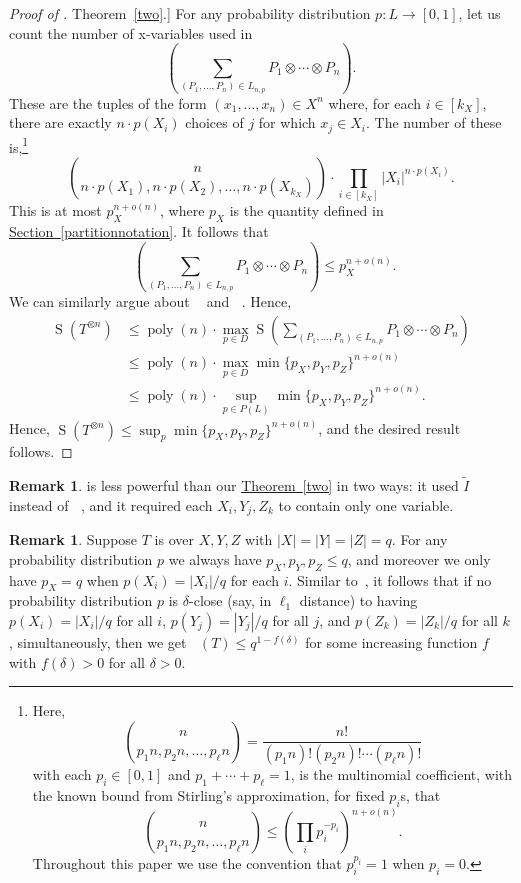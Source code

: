 \documentclass[11pt]{article}
\numberwithin{equation}{section}
\theoremstyle{definition}
\newtheorem{remark}[theorem]{Remark}
\theoremstyle{plain}
\newcommand{\expref}[2]{\hyperref[#2]{#1~\ref{#2}}}
\newcommand{\poly}{\mathop{\mathrm{poly}}}
\newcommand{\sr}{\mathop{\operatorname{S}}}
\newcommand{\xr}{\mathop{\operatorname{S_x}}}
\newcommand{\yr}{\mathop{\operatorname{S_y}}}
\newcommand{\zr}{\mathop{\operatorname{S_z}}}
\newcommand{\tsr}{\mathop{\tilde{\operatorname{S}}}}
\theoremstyle{definition}
\begin{document}
\begin{proof}[Proof of \expref{Theorem}{two}.]
For any probability distribution $p : L \to [0,1]$, let us count the number of x-variables used in
\[
  \left( \sum_{(P_1, \ldots, P_n) \in L_{n,p}}P_1 \otimes \cdots \otimes P_n \right).
\]
These are the tuples of the form $(x_1, \ldots, x_n) \in X^n$ where, for each $i \in [k_X]$, there are exactly $n \cdot p(X_i)$ choices of $j$ for which $x_j \in X_i$. The number of these is,\footnote{Here, \[
    \binom{n}{p_1 n, p_2 n, \ldots, p_\ell n } = \frac{n!}{(p_1 n)! (p_2 n)! \cdots (p_\ell n)!}
  \]
  with each $p_i \in [0,1]$ and $p_1 + \cdots + p_\ell = 1$, is the multinomial coefficient, with the known bound from Stirling's approximation, for fixed $p_i$s, that
  \[
    \binom{n}{p_1 n, p_2 n, \ldots, p_\ell n} \leq  \left( \prod_i p_i^{- p_i} \right)^{n + o(n)}.
  \]
  Throughout this paper we use the convention that $p_i^{p_i} = 1$ when $p_i = 0$.}
$$\binom{n}{n \cdot p(X_1), n \cdot p(X_2), \ldots, n \cdot p(X_{k_X})} \cdot \prod_{i \in [k_X]} |X_i|^{n \cdot p(X_i)}.$$
This is
%
at most  %
$p_X^{n + o(n)}$, where $p_X$ is the quantity defined in \expref{Section}{partitionnotation}. It follows that
\[
  \xr \left( \sum_{(P_1, \ldots, P_n) \in L_{n,p}}P_1 \otimes \cdots \otimes P_n \right) \leq p_X^{n + o(n)}.
\]
We can similarly argue about $\yr$ and $\zr$. Hence,
\begin{align*}
    \sr(T^{\otimes n}) &\leq \poly(n) \cdot \max_{p \in D} \sr\left( \sum_{(P_1, \ldots, P_n) \in L_{n,p}}P_1 \otimes \cdots \otimes P_n \right) \\ &\leq \poly(n) \cdot \max_{p \in D} \min\{ p_X, p_Y, p_Z\}^{n + o(n)} \\ &\leq \poly(n) \cdot \sup_{p \in P(L)} \min\{ p_X, p_Y, p_Z\}^{n + o(n)}.
\end{align*}
Hence, $\sr(T^{\otimes n}) \leq \sup_{p} \min\{ p_X, p_Y, p_Z\}^{n + o(n)}$, and the desired result follows.
\end{proof}

\begin{remark}
\cite[Theorem~5.2]{aw} is less powerful than our \expref{Theorem}{two} in two ways: it used $\tilde{I}$ instead of $\tsr$, and it required each $X_i, Y_j, Z_k$ to contain only one variable.
\end{remark}

\begin{remark}
Suppose $T$ is over $X,Y,Z$ with $|X|=|Y|=|Z|=q$. For any probability distribution $p$ we always have $p_X, p_Y, p_Z \leq q$, and moreover we only have $p_X = q$ when $p(X_i) = |X_i|/q$ for each $i$. Similar to~\cite[Corollary~5.1]{aw}, it follows that if no probability distribution $p$ is $\delta$-close (say, in $\ell_1$ distance) to having $p(X_i) = |X_i|/q$ for all $i$, $p(Y_j) = |Y_j|/q$ for all $j$, and $p(Z_k) = |Z_k|/q$ for all $k$, simultaneously, then we get $\tsr(T) \leq q^{1 - f(\delta)}$ for some increasing function $f$ with $f(\delta)>0$ for all $\delta>0$. 
\end{remark}
\end{document}
